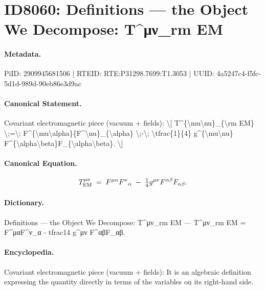 \section*{ID8060: Definitions — the Object We Decompose: T\textasciicircum{}μν\_rm EM}
\paragraph{Metadata.}
PiID: 2909945681506 | RTEID: RTE:P31298.7699:T1.3053 | UUID: 4a5247c4-f5fc-5d1d-989d-90eb86e3d9ac

\paragraph{Canonical Statement.}
Covariant electromagnetic piece (vacuum + fields): \textbackslash{}[ T\textasciicircum{}\{\textbackslash{}mu\textbackslash{}nu\}\_\{\textbackslash{}rm EM\} \textbackslash{};=\textbackslash{}; F\textasciicircum{}\{\textbackslash{}mu\textbackslash{}alpha\}\{F\textasciicircum{}\textbackslash{}nu\}\_\{\textbackslash{}alpha\} \textbackslash{};-\textbackslash{}; \textbackslash{}tfrac\{1\}\{4\} g\textasciicircum{}\{\textbackslash{}mu\textbackslash{}nu\} F\textasciicircum{}\{\textbackslash{}alpha\textbackslash{}beta\}F\_\{\textbackslash{}alpha\textbackslash{}beta\}. \textbackslash{}]

\paragraph{Canonical Equation.}
\[
T^{\mu\nu}_{\rm EM} \;=\; F^{\mu\alpha}{F^\nu}_{\alpha} \;-\; \tfrac{1}{4} g^{\mu\nu} F^{\alpha\beta}F_{\alpha\beta}.
\]

\paragraph{Dictionary.}
Definitions — the Object We Decompose: T\textasciicircum{}μν\_rm EM — T\textasciicircum{}μν\_rm EM = F\textasciicircum{}μαF\textasciicircum{}ν\_α - tfrac14 g\textasciicircum{}μν F\textasciicircum{}αβF\_αβ.

\paragraph{Encyclopedia.}
Covariant electromagnetic piece (vacuum + fields): It is an algebraic definition expressing the quantity directly in terms of the variables on its right-hand side.
